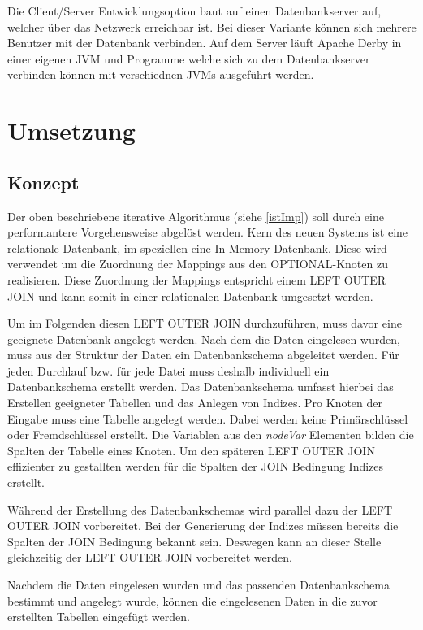 \documentclass[draft,final]{vutinfth} %
\begin{document}
Die Client/Server Entwicklungsoption baut auf einen Datenbankserver auf, welcher über das Netzwerk erreichbar ist. Bei dieser Variante können sich mehrere Benutzer mit der Datenbank verbinden. Auf dem Server läuft Apache Derby in einer eigenen JVM und Programme welche sich zu dem Datenbankserver verbinden können mit verschiednen JVMs ausgeführt werden.


 
\cite{ApaDoc}

\chapter{Umsetzung} \label{umsetzung}
\section{Konzept}
Der oben beschriebene iterative Algorithmus (siehe \ref{istImp}) soll durch eine performantere Vorgehensweise abgelöst werden. Kern des neuen Systems ist eine relationale Datenbank, im speziellen eine In-Memory Datenbank. Diese wird verwendet um die Zuordnung der Mappings aus den OPTIONAL-Knoten zu realisieren. Diese Zuordnung der Mappings entspricht einem LEFT OUTER JOIN und kann somit in einer relationalen Datenbank umgesetzt werden.

Um im Folgenden diesen LEFT OUTER JOIN durchzuführen, muss davor eine geeignete Datenbank angelegt werden. Nach dem die Daten eingelesen wurden, muss aus der Struktur der Daten ein Datenbankschema abgeleitet werden. Für jeden Durchlauf bzw. für jede Datei muss deshalb individuell ein Datenbankschema erstellt werden. Das Datenbankschema umfasst hierbei das Erstellen geeigneter Tabellen und das Anlegen von Indizes. Pro Knoten der Eingabe muss eine Tabelle angelegt werden. Dabei werden keine Primärschlüssel oder Fremdschlüssel erstellt. Die Variablen aus den \textit{nodeVar} Elementen bilden die Spalten der Tabelle eines Knoten. Um den späteren LEFT OUTER JOIN effizienter zu gestallten werden für die Spalten der JOIN Bedingung Indizes erstellt.

Während der Erstellung des Datenbankschemas wird parallel dazu der LEFT OUTER JOIN vorbereitet. Bei der Generierung der Indizes müssen bereits die Spalten der JOIN Bedingung bekannt sein. Deswegen kann an dieser Stelle gleichzeitig der LEFT OUTER JOIN vorbereitet werden.

Nachdem die Daten eingelesen wurden und das passenden Datenbankschema bestimmt und angelegt wurde, können die eingelesenen Daten in die zuvor erstellten Tabellen eingefügt werden. 
\end{document}
